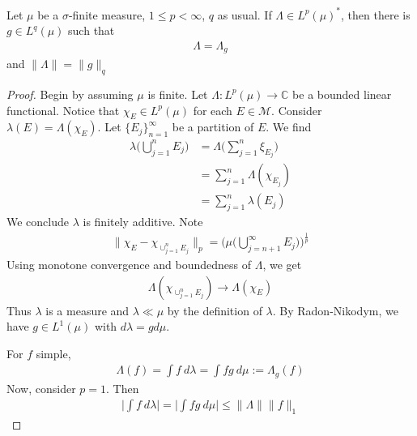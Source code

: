 \begin{theorem}
  Let $\mu$ be a $\sigma$-finite measure, $1 \le p < \infty$, $q$ as
  usual. If $ \Lambda \in L^{p}(\mu)^*$, then there is $ g \in
  L^{q}(\mu)$ such that
  \begin{align*}
    \Lambda = \Lambda_g
  \end{align*}
  and $\|\Lambda\| = \|g\|_q$
\end{theorem}
\begin{proof}
  Begin by assuming $\mu$ is finite. Let $\Lambda : L^{p}(\mu) \to
  \mathbb{C}$ be a bounded linear functional. Notice that $\chi_E \in
  L^{p}(\mu)$ for each $E \in \mathcal{M}$. Consider $\lambda(E) =
  \Lambda(\chi_E)$. Let $\{E_j\}_{n = 1}^\infty$ be a partition of $E$. We find
  \begin{align*}
    \lambda \Big( \bigcup_{j = 1}^{n}E_j \Big) &= \Lambda \Big(
    \sum_{j = 1}^n \xi_{E_j} \Big) \\
    &= \sum_{j = 1}^{n} \Lambda(\chi_{E_j}) \\
    &= \sum_{ j = 1}^{n} \lambda(E_j)
  \end{align*}
  We conclude $\lambda$ is finitely additive. Note
  \begin{align*}
    \Big \| \chi_E - \chi_{\cup_{j = 1}^{n}E_j} \Big \|_p = \Big(
    \mu\big(\bigcup_{j = n+1}^{\infty} E_j\big)\Big)^{\frac{1}{p}}
  \end{align*}
  Using monotone convergence and boundedness of $\Lambda$, we get
  \begin{align*}
    \Lambda(  \chi_{\cup_{j = 1}^{n}E_j}) \to \Lambda(\chi_E)
  \end{align*}
  Thus $\lambda$ is a measure and $\lambda \ll \mu$ by the definition
  of $\lambda$. By
  Radon-Nikodym, we have $g \in L^{1}(\mu)$ with $d \lambda = g d \mu$.

  For $f$ simple,
  \begin{align*}
    \Lambda(f) = \int f \ d \lambda = \int fg \ d \mu := \Lambda_g(f)
  \end{align*}
  Now, consider $p = 1$. Then
  \begin{align*}
    \Big|\int f \ d \lambda\Big| = \Big|\int fg \ d \mu\Big| \le
    \|\Lambda\| \|f\|_1
  \end{align*}
\end{proof}
